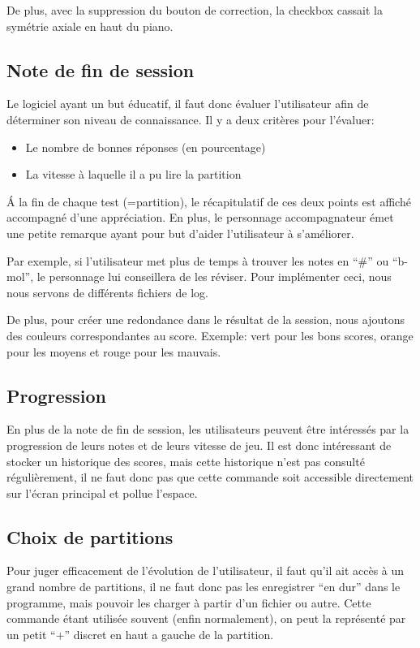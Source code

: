 \documentclass{article}
\begin{document}
De plus, avec la suppression du bouton de correction, la checkbox cassait la symétrie axiale en haut du piano. 
\subsection{Note de fin de session}
Le logiciel ayant un but éducatif, il faut donc évaluer l'utilisateur afin de déterminer son niveau de connaissance.
Il y a deux critères pour l'évaluer:
\begin{itemize}
 \item Le nombre de bonnes réponses (en pourcentage)
 \item La vitesse à laquelle il a pu lire la partition
\end{itemize}
\'A la fin de chaque test (=partition), le récapitulatif de ces deux points est affiché accompagné d'une appréciation.
En plus, le personnage accompagnateur émet une petite remarque ayant pour but d'aider l'utilisateur à s'améliorer.

Par exemple, si l'utilisateur met plus de temps à trouver les notes en ``\#'' ou ``b-mol'', le personnage lui conseillera de les réviser.
Pour implémenter ceci, nous nous servons de différents fichiers de log.


De plus, pour créer une redondance dans le résultat de la session, nous ajoutons des couleurs correspondantes au score. Exemple: vert pour les bons scores,
orange pour les moyens et rouge pour les mauvais.
\subsection{Progression}
En plus de la note de fin de session, les utilisateurs peuvent être intéressés par la progression de leurs notes et de leurs vitesse
de jeu. Il est donc intéressant de stocker un historique des scores, mais cette historique n'est pas consulté régulièrement, il ne 
faut donc pas que cette commande soit accessible directement sur l'écran principal et pollue l'espace.
\subsection{Choix de partitions}
Pour juger efficacement de l'évolution de l'utilisateur, il faut qu'il ait accès à un grand nombre de partitions, il ne faut donc 
pas les enregistrer ``en dur'' dans le programme, mais pouvoir les charger à partir d'un fichier ou autre. Cette commande étant utilisée
 souvent (enfin normalement), on peut la représenté par un petit ``+'' discret en haut a gauche de la partition.
 
\end{document}
